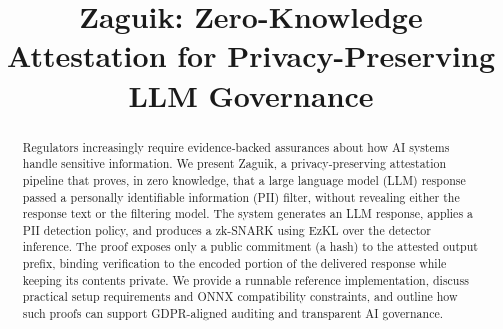\documentclass[10pt,conference,a4paper]{IEEEtran}
\begin{document}
\title{Zaguik: Zero-Knowledge Attestation for Privacy-Preserving LLM Governance}
%

\author{
\and
{}
}


\maketitle


\begin{abstract}
Regulators increasingly require evidence-backed assurances about how AI systems
handle sensitive information. We present Zaguik, a privacy-preserving attestation
pipeline that proves, in zero knowledge, that a large language model (LLM)
response passed a personally identifiable information (PII) filter, without
revealing either the response text or the filtering model. The system generates
an LLM response, applies a PII detection policy, and produces a
zk-SNARK using EzKL over the detector inference. The proof exposes only a public commitment (a hash) to the attested output prefix, binding verification to the encoded portion of the delivered response while keeping its contents private. We provide a runnable reference
implementation, discuss practical setup requirements and ONNX compatibility constraints, and outline how such
proofs can support GDPR-aligned auditing and transparent AI governance.
\end{abstract}
%

\end{document}
